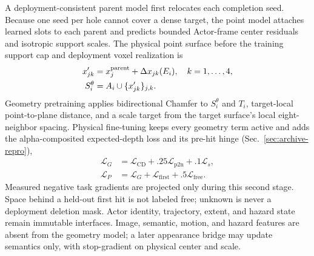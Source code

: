 A deployment-consistent parent model first relocates each completion seed. Because one seed per hole cannot cover a dense target,
the point model attaches \VSevenOneMSevenBranchFactor{} learned slots to each parent and predicts bounded Actor-frame center
residuals and isotropic support scales. The physical point surface before the training support cap and deployment voxel realization is
\begin{equation}
\begin{aligned}
x'_{jk}&=x^{\mathrm{parent}}_j+\Delta x_{jk}(E_i),\quad k=1,\ldots,4{},\\
S_i^\theta&=A_i\cup\{x'_{jk}\}_{j,k}.
\end{aligned}
\end{equation}
Geometry pretraining applies bidirectional Chamfer to $S_i^\theta$ and $T_i$, target-local point-to-plane distance, and a scale
target from the target surface's local eight-neighbor spacing. Physical fine-tuning keeps every geometry term active and adds the
alpha-composited expected-depth loss and its pre-hit hinge (Sec.~\ref{sec:archive-repro}),
\begin{equation}
\begin{aligned}
\mathcal L_G&=\mathcal L_{\mathrm{CD}}+.25\mathcal L_{\mathrm{p2n}}+.1\mathcal L_s,\\
\mathcal L_P&=\mathcal L_G+\mathcal L_{\mathrm{first}}+.5\mathcal L_{\mathrm{free}}.
\end{aligned}
\end{equation}
Measured negative task gradients are projected only during this second stage. Space behind a held-out first hit is not labeled
free; unknown is never a deployment deletion mask. Actor identity, trajectory, extent, and hazard state remain immutable interfaces.
Image, semantic, motion, and hazard features are absent from the geometry model; a later appearance bridge may update semantics
only, with stop-gradient on physical center and scale.

